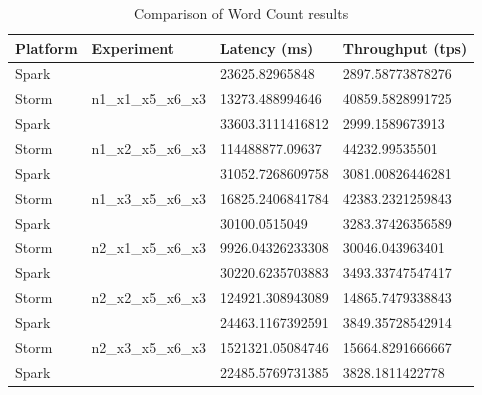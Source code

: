 \documentclass[ppgc,diss,english]{iiufrgs}
\begin{document}
\begin{table}[H]
\tiny
\centering
\caption{Comparison of Word Count results}
\label{table:comparison_wordcount}
\begin{tabular}{|l|l|l|l|}
\hline
Platform & Experiment & Latency (ms) & Throughput (tps)\\ \hline
Spark    &                                      & 23625.82965848                           & 2897.58773878276                         \\ \cline{1-1} \cline{3-4} 
Storm    & \multirow{-2}{*}{n1\_x1\_x5\_x6\_x3} & \cellcolor[HTML]{34E570}13273.488994646  & \cellcolor[HTML]{34E570}40859.5828991725 \\ \hline
Spark    &                                      & \cellcolor[HTML]{34E570}33603.3111416812 & 2999.1589673913 \\ \cline{1-1} \cline{3-4} 
Storm    & \multirow{-2}{*}{n1\_x2\_x5\_x6\_x3} & 114488877.09637                          & \cellcolor[HTML]{34E570}44232.99535501 \\ \hline
Spark    &                                      & 31052.7268609758                         & 3081.00826446281 \\ \cline{1-1} \cline{3-4} 
Storm    & \multirow{-2}{*}{n1\_x3\_x5\_x6\_x3} & \cellcolor[HTML]{34E570}16825.2406841784 & \cellcolor[HTML]{34E570}42383.2321259843 \\ \hline
Spark    &                                      & 30100.0515049                            & 3283.37426356589 \\ \cline{1-1} \cline{3-4} 
Storm    & \multirow{-2}{*}{n2\_x1\_x5\_x6\_x3} & \cellcolor[HTML]{34E570}9926.04326233308 & \cellcolor[HTML]{34E570}30046.043963401 \\ \hline
Spark    &                                      & \cellcolor[HTML]{34E570}30220.6235703883 & 3493.33747547417 \\ \cline{1-1} \cline{3-4} 
Storm    & \multirow{-2}{*}{n2\_x2\_x5\_x6\_x3} & 124921.308943089                         & \cellcolor[HTML]{34E570}14865.7479338843 \\ \hline
Spark    &                                      & \cellcolor[HTML]{34E570}24463.1167392591 & 3849.35728542914 \\ \cline{1-1} \cline{3-4} 
Storm    & \multirow{-2}{*}{n2\_x3\_x5\_x6\_x3} & 1521321.05084746                         & \cellcolor[HTML]{34E570}15664.8291666667 \\ \hline
Spark    &                                      & \cellcolor[HTML]{34E570}22485.5769731385 & 3828.1811422778 \\ \cline{1-1} \cline{3-4} 

\end{tabular}
\end{table}
\end{document}
